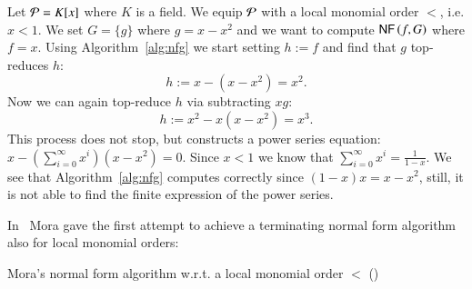 \begin{example}
Let $\mathcal{P} = K[x]$ where $K$ is a field. We equip $\mathcal{P}$ with a local monomial
order $<$, i.e. $x < 1$. We set $G = \{g\}$ where $g=x-x^2$ and we want to
compute $\text{\sffamily{NF}}\left({f},{G}\right)$ where $f = x$. Using Algorithm~\ref{alg:nfg} we start setting
$h := f$ and find that $g$ top-reduces $h$:
\[h := x - \left(x-x^2\right) = x^2.\]
Now we can again top-reduce $h$ via subtracting $xg$:
\[h := x^2 - x\left(x-x^2\right) = x^3.\]
This process does not stop, but constructs a power series equation:
$x - \left(\sum_{i=0}^\infty x^i\right) \left(x-x^2\right) = 0.$
Since $x<1$ we know that $\sum_{i=0}^\infty x^i = \frac{1}{1-x}$. We see that
Algorithm~\ref{alg:nfg} computes correctly since $(1-x) x = x-x^2$,
still, it is not able to find the finite expression of the power series.
\end{example}

In~\cite{mora82} Mora gave the first attempt to achieve a terminating normal
form algorithm also for local monomial orders:

\begin{algorithm}[h]
\caption{Mora's normal form algorithm w.r.t. a local monomial order $<$
  (\nfn)} 
\label{alg:nfl}
\begin{algorithmic}[1]
\EndIf
{}
\EndWhile
{}
\end{algorithmic}
\end{algorithm}

